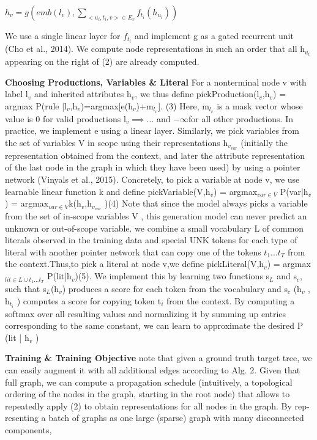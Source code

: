\documentclass{article}
\begin{document}
\begin{math}
h_v = g(emb(l_v), \sum_{<u_i,t_i,v>\in E_v} f_{t_i} (h_{u_i}))
\end{math}

We use a single linear layer for $f_{t_i}$ and implement g as a gated recurrent unit (Cho et al., 2014). We compute node representations in such an order that all h$_{u_i}$ appearing on the right of (2) are already computed.

\textbf{Choosing Productions, Variables \& Literal} For a nonterminal node v with label l$_v$ and inherited attributes h$_v$, we thus define pickProduction(l$_v$,h$_v$) = argmax P(rule |l$_v$,h$_v$)=argmax[e(h$_v$)+m$_{l_v}$]. (3) Here, m$_{l_v}$ is a mask vector whose value is 0 for valid productions l$_v \implies ...$ and $-\infty$for all other productions. In practice, we implement e using a linear layer. Similarly, we pick variables from the set of variables V in scope using their representations h$_{v_{var}}$ (initially the representation obtained from the context, and later the attribute representation of the last node in the graph in which they have been used) by using a pointer network (Vinyals et al., 2015). Concretely, to pick a variable at node v, we use learnable linear function k and define pickVariable(V,h$_v$) = argmax$_{var \in V}$ P(var|h$_v$) = argmax$_{var \in V}$k(h$_v$,h$_{v_{var}}$ )(4) Note that since the model always picks a variable from the set of in-scope variables V , this generation model can never predict an unknown or out-of-scope variable. we combine a small vocabulary L of common literals observed in the training data and special UNK tokens for each type of literal with another pointer network that can copy one of the tokens $t_1...t_T$ from the context.Thus,to pick a literal at node v,we define pickLiteral(V,h$_v$) = argmax$_{lit\in L \cup {t_1...t_T}}$ P(lit|h$_v$)(5). We implement this by learning two functions s$_L$ and s$_c$, such that s$_L$(h$_v$) produces a score for each token from the vocabulary and s$_c$ (h$_v$ , h$_{t_i}$ ) computes a score for copying token t$_i$ from the context. By computing a softmax over all resulting values and normalizing it by summing up entries corresponding to the same constant, we can learn to approximate the desired P (lit | h$_v$ )

\textbf{Training \& Training Objective} note that given a ground truth target tree, we can easily augment it with all additional edges according to Alg. 2. Given that full graph, we can compute a propagation schedule (intuitively, a topological ordering of the nodes in the graph, starting in the root node) that allows to repeatedly apply (2) to obtain representations for all nodes in the graph. By rep- resenting a batch of graphs as one large (sparse) graph with many disconnected components,
\end{document}
